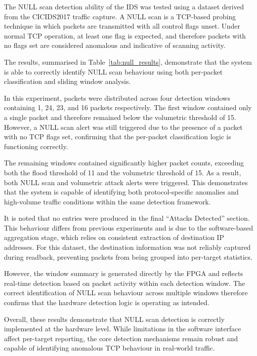 The NULL scan detection ability of the IDS was tested using a dataset
derived from the CICIDS2017 traffic capture. A NULL scan is a TCP-based probing
technique in which packets are transmitted with all control flags unset. Under
normal TCP operation, at least one flag is expected, and therefore packets with
no flags set are considered anomalous and indicative of scanning activity.

The results, summarised in Table~\ref{tab:null_results}, demonstrate that the
system is able to correctly identify NULL scan behaviour using both per-packet
classification and sliding window analysis.

In this experiment, packets were distributed across four detection windows
containing 1, 24, 23, and 16 packets respectively. The first window contained
only a single packet and therefore remained below the volumetric threshold of
15. However, a NULL scan alert was still triggered due to the presence of a
packet with no TCP flags set, confirming that the per-packet classification
logic is functioning correctly.

The remaining windows contained significantly higher packet counts, exceeding
both the flood threshold of 11 and the volumetric threshold of 15. As a result,
both NULL scan and volumetric attack alerts were triggered. This demonstrates
that the system is capable of identifying both protocol-specific anomalies and
high-volume traffic conditions within the same detection framework.

It is noted that no entries were produced in the final ``Attacks Detected''
section. This behaviour differs from previous experiments and is due to the
software-based aggregation stage, which relies on consistent extraction of
destination IP addresses. For this dataset, the destination information was not
reliably captured during readback, preventing packets from being grouped into
per-target statistics.

However, the window summary is generated directly by the FPGA and reflects
real-time detection based on packet activity within each detection window. The
correct identification of NULL scan behaviour across multiple windows therefore
confirms that the hardware detection logic is operating as intended.

Overall, these results demonstrate that NULL scan detection is correctly
implemented at the hardware level. While limitations in the software interface
affect per-target reporting, the core detection mechanisms remain robust and
capable of identifying anomalous TCP behaviour in real-world traffic.



